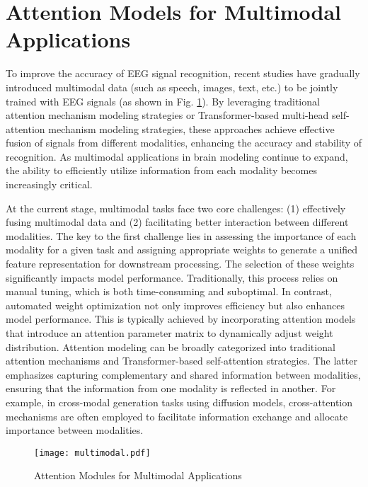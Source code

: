 \documentclass[preprint,12pt]{elsarticle}
\begin{document}
\section{Attention Models for Multimodal Applications}
To improve the accuracy of EEG signal recognition, recent studies have gradually introduced multimodal data (such as speech, images, text, etc.) to be jointly trained with EEG signals (as shown in Fig. \ref{fig:multi-model}). By leveraging traditional attention mechanism modeling strategies or Transformer-based multi-head self-attention mechanism modeling strategies, these approaches achieve effective fusion of signals from different modalities, enhancing the accuracy and stability of recognition. As multimodal applications in brain modeling continue to expand, the ability to efficiently utilize information from each modality becomes increasingly critical.

At the current stage, multimodal tasks face two core challenges: (1) effectively fusing multimodal data and (2) facilitating better interaction between different modalities. The key to the first challenge lies in assessing the importance of each modality for a given task and assigning appropriate weights to generate a unified feature representation for downstream processing. The selection of these weights significantly impacts model performance. Traditionally, this process relies on manual tuning, which is both time-consuming and suboptimal. In contrast, automated weight optimization not only improves efficiency but also enhances model performance. This is typically achieved by incorporating attention models that introduce an attention parameter matrix to dynamically adjust weight distribution. Attention modeling can be broadly categorized into traditional attention mechanisms and Transformer-based self-attention strategies. The latter emphasizes capturing complementary and shared information between modalities, ensuring that the information from one modality is reflected in another. For example, in cross-modal generation tasks using diffusion models, cross-attention mechanisms are often employed to facilitate information exchange and allocate importance between modalities.

\begin{figure}[h]
	\centering
	  \texttt{[image: multimodal.pdf]}
	\caption{Attention Modules for Multimodal Applications}
 \label{fig:multi-model}
\end{figure}
\end{document}
